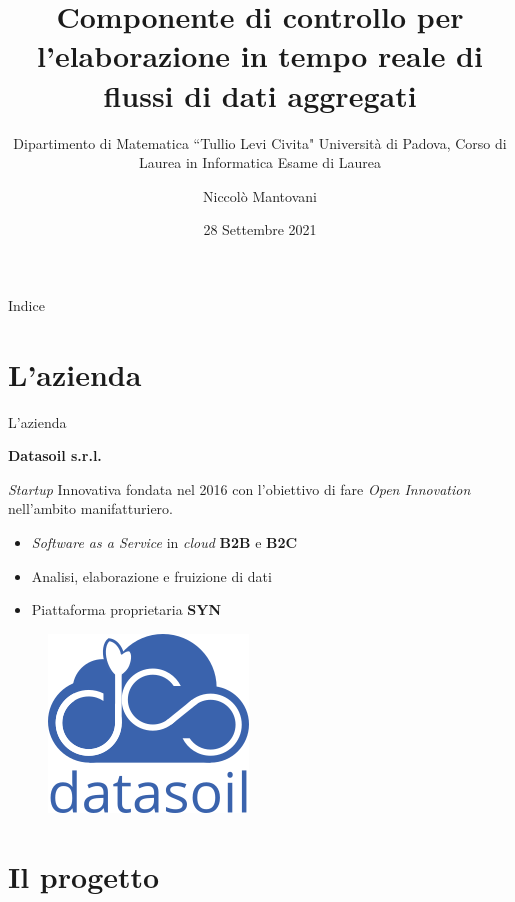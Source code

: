 \documentclass{beamer}
\title{Componente di controllo per l'elaborazione in tempo reale di flussi di dati aggregati}
\subtitle{Dipartimento di Matematica ``Tullio Levi Civita" Università di Padova, Corso di Laurea in Informatica Esame di Laurea}
\date{28 Settembre 2021}
\author{Niccolò Mantovani}
\begin{document}
	\maketitle

	\begin{frame}{Indice}
		\tableofcontents
	\end{frame}


	\section{L'azienda}

	\begin{frame}{L'azienda}

		\textbf{Datasoil s.r.l.} \vspace{.2em}
		
		\textit{Startup} Innovativa fondata nel 2016 con l'obiettivo di fare \textit{Open Innovation} nell'ambito manifatturiero. \vspace{.2em}
		
		\begin{itemize}
			\item \textit{Software as a Service} in \textit{cloud} \textbf{B2B} e \textbf{B2C} \vspace{.5em}
			\item Analisi, elaborazione e fruizione di dati \vspace{.5em}
			\item Piattaforma proprietaria \textbf{SYN}
		\end{itemize}
		
		\begin{figure}[!h] 
    		\centering 
    		\includegraphics[width=0.2\columnwidth]{../immagini/ds_logo.png}
		\end{figure}

	\end{frame}

	\section{Il progetto}
\end{document}
